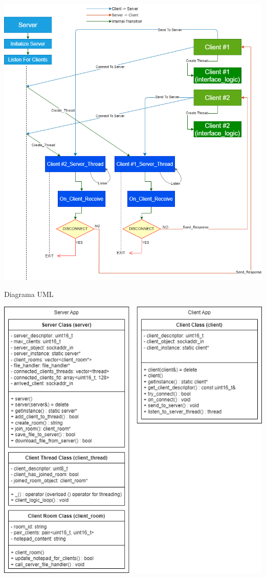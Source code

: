 \documentclass{article}
\begin{document}
\includegraphics[scale=0.403]{tcp.png}


\newpage
{\Large Diagrama UML}


\includegraphics[scale=0.529]{uml.png}
\end{document}
